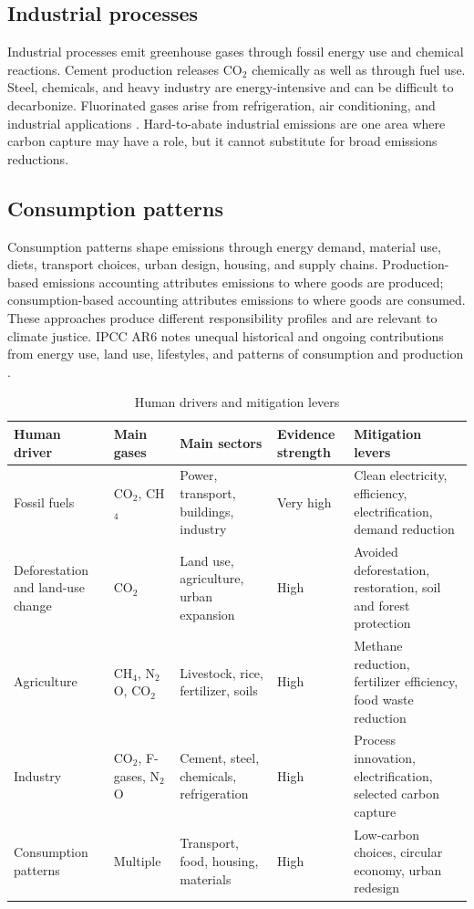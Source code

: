 \documentclass[12pt]{article}
\begin{document}
\subsection{Industrial processes}

Industrial processes emit greenhouse gases through fossil energy use and chemical reactions. Cement production releases CO$_2$ chemically as well as through fuel use. Steel, chemicals, and heavy industry are energy-intensive and can be difficult to decarbonize. Fluorinated gases arise from refrigeration, air conditioning, and industrial applications \cite{ref4}. Hard-to-abate industrial emissions are one area where carbon capture may have a role, but it cannot substitute for broad emissions reductions.

\subsection{Consumption patterns}

Consumption patterns shape emissions through energy demand, material use, diets, transport choices, urban design, housing, and supply chains. Production-based emissions accounting attributes emissions to where goods are produced; consumption-based accounting attributes emissions to where goods are consumed. These approaches produce different responsibility profiles and are relevant to climate justice. IPCC AR6 notes unequal historical and ongoing contributions from energy use, land use, lifestyles, and patterns of consumption and production \cite{ref1}.

\begin{table}[htbp]
\centering
\caption{Human drivers and mitigation levers}
\begin{tabularx}{\textwidth}{p{2.8cm}p{2.7cm}Yp{2.5cm}Y}
\toprule
Human driver & Main gases & Main sectors & Evidence strength & Mitigation levers \\
\midrule
Fossil fuels & CO$_2$, CH$_4$ & Power, transport, buildings, industry & Very high & Clean electricity, efficiency, electrification, demand reduction \\
Deforestation and land-use change & CO$_2$ & Land use, agriculture, urban expansion & High & Avoided deforestation, restoration, soil and forest protection \\
Agriculture & CH$_4$, N$_2$O, CO$_2$ & Livestock, rice, fertilizer, soils & High & Methane reduction, fertilizer efficiency, food waste reduction \\
Industry & CO$_2$, F-gases, N$_2$O & Cement, steel, chemicals, refrigeration & High & Process innovation, electrification, selected carbon capture \\
Consumption patterns & Multiple & Transport, food, housing, materials & High & Low-carbon choices, circular economy, urban redesign \\
\bottomrule
\end{tabularx}
\end{table}
\end{document}
